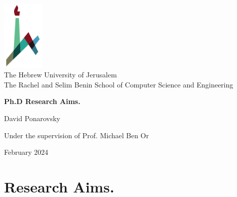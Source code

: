 \documentclass[11pt, oneside]{book}
\begin{document}

\begin{titlepage}
    \begin{center}
        \vspace*{1cm}
        
        \includegraphics[width=0.15\textwidth]{huji_logo_notext.pdf}\\
        { \large The Hebrew University of Jerusalem\\
        The Rachel and Selim Benin School of Computer Science and Engineering }
        
        \vspace{2cm}
        
        {\huge \textbf{Ph.D Research Aims.}}
        
        \vspace{1cm}
        
        \vspace{1.5cm}
        
        { \large David Ponarovsky }
        
        \vspace{1cm}
        
        { \large  Under the supervision of Prof. Michael Ben Or }

        
        \vfill
        
        {\large February 2024 }
    \end{center}
\end{titlepage}

\setlength{\parindent}{0pt}
\setlength{\parskip}{5pt}

\chapter{Research Aims.}
\end{document}
